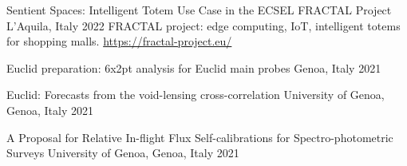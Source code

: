 


\begin{cventries}


\cventry
{
}
{
    Sentient Spaces: Intelligent Totem Use Case in the ECSEL FRACTAL Project
}
{L'Aquila, Italy}
{2022}
{
    FRACTAL project: edge computing, IoT, intelligent totems for shopping malls. \url{https://fractal-project.eu/}
}


\cventry
{} %
{Euclid preparation: 6x2pt analysis for Euclid main probes} %
{Genoa, Italy}
{2021} %
{ %
\begin{cvitems}
  \item {
  }
\end{cvitems}
}


\cventry
{} %
{Euclid: Forecasts from the void-lensing cross-correlation} %
{University of Genoa, Genoa, Italy}
{2021} %
{ %
\begin{cvitems}
  \item {
  }
\end{cvitems}
}
\cventry
{} %
{A Proposal for Relative In-flight Flux Self-calibrations for Spectro-photometric Surveys} %
{University of Genoa, Genoa, Italy}
{2021} %
{
\begin{cvitems}
  \item {
  }
\end{cvitems}
}

\end{cventries}